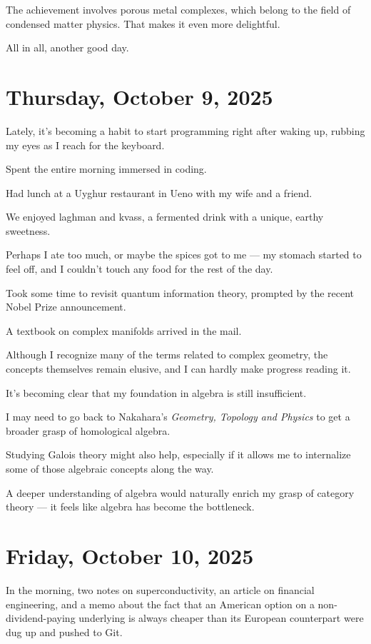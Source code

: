 \documentclass[uplatex]{jsarticle}
\begin{document}
The achievement involves porous metal complexes, which belong to the field of condensed matter physics. That makes it even more delightful.

All in all, another good day.


\section{Thursday, October 9, 2025}

Lately, it's becoming a habit to start programming right after waking up, rubbing my eyes as I reach for the keyboard.

Spent the entire morning immersed in coding.

Had lunch at a Uyghur restaurant in Ueno with my wife and a friend.

We enjoyed laghman and kvass, a fermented drink with a unique, earthy sweetness.

Perhaps I ate too much, or maybe the spices got to me — my stomach started to feel off, and I couldn’t touch any food for the rest of the day.

Took some time to revisit quantum information theory, prompted by the recent Nobel Prize announcement.

A textbook on complex manifolds arrived in the mail.

Although I recognize many of the terms related to complex geometry, the concepts themselves remain elusive, and I can hardly make progress reading it.

It’s becoming clear that my foundation in algebra is still insufficient.

I may need to go back to Nakahara’s \textit{Geometry, Topology and Physics} to get a broader grasp of homological algebra.

Studying Galois theory might also help, especially if it allows me to internalize some of those algebraic concepts along the way.

A deeper understanding of algebra would naturally enrich my grasp of category theory — it feels like algebra has become the bottleneck.

\section{Friday, October 10, 2025}

In the morning, two notes on superconductivity, an article on financial engineering, and a memo about the fact that an American option on a non-dividend-paying underlying is always cheaper than its European counterpart were dug up and pushed to Git.
\end{document}
